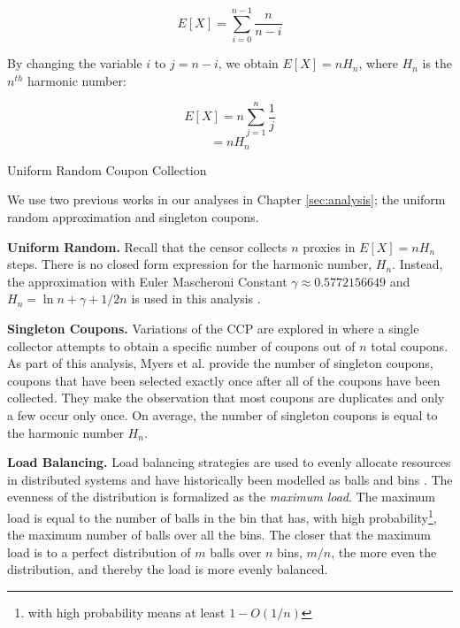$$E[X] = \sum_{i=0}^{n-1}\frac{n}{n-i}$$

By changing the variable $i$ to $j=n-i$, we obtain $E[X] = nH_n$, where $H_n$ is the $n^{th}$ harmonic number:

$$E[X] = n \sum_{j=1}^{n}\frac{1}{j}$$
$$= nH_n$$

\begin{algorithm}[t]
\DontPrintSemicolon
{}
\caption{Uniform Random Coupon Collection \label{uni}}
\end{algorithm}

We use two previous works in our analyses in Chapter \ref{sec:analysis}; the uniform random approximation and singleton coupons.

\textbf{Uniform Random.} Recall that the censor collects $n$ proxies in $E[X]= nH_n$ steps. There is no closed form expression for the harmonic number, $H_n$. Instead, the approximation with Euler Mascheroni Constant $\gamma \approx 0.5772156649$ and $H_n = \ln{n} + \gamma + 1/2n$ is used in this analysis \cite{flajolet1992birthday}.

\textbf{Singleton Coupons.} Variations of the CCP are explored in \cite{myers2006some} where a single collector attempts to obtain a specific number of coupons out of $n$ total coupons. As part of this analysis, Myers et al. provide the number of singleton coupons, coupons that have been selected exactly once after all of the coupons have been collected. They make the observation that most coupons are duplicates and only a few occur only once. On average, the number of singleton coupons is equal to the harmonic number $H_n$. %

\textbf{Load Balancing.} Load balancing strategies are used to evenly allocate resources in distributed systems and have historically been modelled as balls and bins \cite{mitzenmacher2005probability}. The evenness of the distribution is formalized as the \textit{maximum load}. The maximum load is equal to the number of balls in the bin that has, with high probability\footnote{with high probability means at least $1 - O(1/n)$}, the maximum number of balls over all the bins. The closer that the maximum load is to a perfect distribution of $m$ balls over $n$ bins, $m/n$, the more even the distribution, and thereby the load is more evenly balanced. 

